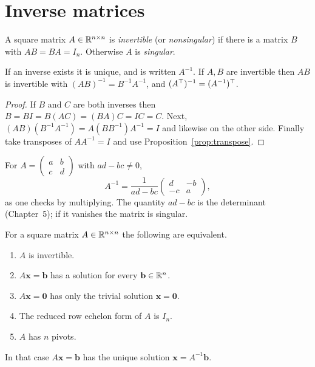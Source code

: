 \section{Inverse matrices}

\begin{definition}
A square matrix $A\in\mathbb{R}^{n\times n}$ is \emph{invertible} (or \emph{nonsingular}) if there is a matrix $B$ with $AB=BA=I_n$. Otherwise $A$ is \emph{singular}.
\end{definition}

\begin{proposition}\label{prop:invrules}
If an inverse exists it is unique, and is written $A^{-1}$. If $A,B$ are invertible then $AB$ is invertible with $(AB)^{-1}=B^{-1}A^{-1}$, and $(A^{\top})^{-1}=(A^{-1})^{\top}$.
\end{proposition}

\begin{proof}
If $B$ and $C$ are both inverses then $B=BI=B(AC)=(BA)C=IC=C$. Next, $(AB)(B^{-1}A^{-1})=A(BB^{-1})A^{-1}=I$ and likewise on the other side. Finally take transposes of $AA^{-1}=I$ and use Proposition~\ref{prop:transpose}.
\end{proof}

\begin{example}
For $A=\begin{pmatrix}a&b\\c&d\end{pmatrix}$ with $ad-bc\ne0$,
\[ A^{-1}=\frac{1}{ad-bc}\begin{pmatrix}d&-b\\-c&a\end{pmatrix}, \]
as one checks by multiplying. The quantity $ad-bc$ is the determinant (Chapter~5); if it vanishes the matrix is singular.
\end{example}

\begin{theorem}\label{thm:imt1}
For a square matrix $A\in\mathbb{R}^{n\times n}$ the following are equivalent.
\begin{enumerate}[label=(\alph*)]
  \item $A$ is invertible.
  \item $A\mathbf{x}=\mathbf{b}$ has a solution for every $\mathbf{b}\in\mathbb{R}^n$.
  \item $A\mathbf{x}=\mathbf{0}$ has only the trivial solution $\mathbf{x}=\mathbf{0}$.
  \item The reduced row echelon form of $A$ is $I_n$.
  \item $A$ has $n$ pivots.
\end{enumerate}
In that case $A\mathbf{x}=\mathbf{b}$ has the unique solution $\mathbf{x}=A^{-1}\mathbf{b}$.
\end{theorem}

